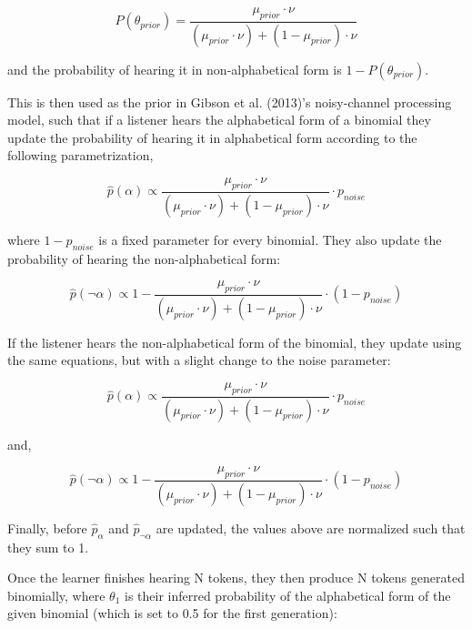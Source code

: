 \documentclass[
  jou,floatsintext]{apa6}
\begin{document}
\begin{equation}
\label{eq:thetaPrior}
P(\theta_{prior}) = \frac{\mu_{prior} \cdot \nu}{(\mu_{prior} \cdot \nu) + (1 - \mu_{prior}) \cdot \nu}
\end{equation}

and the probability of hearing it in non-alphabetical form is \(1-P(\theta_{prior})\).

This is then used as the prior in Gibson et al. (2013)'s noisy-channel processing model, such that if a listener hears the alphabetical form of a binomial they update the probability of hearing it in alphabetical form according to the following parametrization,

\begin{equation}
\label{eq:phatAlpha}
\hat{p}(\alpha) \propto \frac{\mu_{prior} \cdot \nu}{(\mu_{prior} \cdot \nu) + (1 - \mu_{prior}) \cdot \nu} \cdot p_{noise}
\end{equation}

where \(1 - p_{noise}\) is a fixed parameter for every binomial. They also update the probability of hearing the non-alphabetical form:

\begin{equation}
\label{eq:phatNonalpha}
\hat{p}(\neg\alpha) \propto 1 - \frac{\mu_{prior} \cdot \nu}{(\mu_{prior} \cdot \nu) + (1 - \mu_{prior}) \cdot \nu} \cdot (1-p_{noise})
\end{equation}

If the listener hears the non-alphabetical form of the binomial, they update using the same equations, but with a slight change to the noise parameter:

\begin{equation}
\label{eq:phatAlpha2}
\hat{p}(\alpha) \propto \frac{\mu_{prior} \cdot \nu}{(\mu_{prior} \cdot \nu) + (1 - \mu_{prior}) \cdot \nu} \cdot p_{noise} 
\end{equation}

and,

\begin{equation}
\label{eq:phatNonalpha2}
\hat{p}(\neg\alpha) \propto 1 - \frac{\mu_{prior} \cdot \nu}{(\mu_{prior} \cdot \nu) + (1 - \mu_{prior}) \cdot \nu} \cdot (1-p_{noise}) 
\end{equation}

Finally, before \(\hat{p}_\alpha\) and \(\hat{p}_{\neg\alpha}\) are updated, the values above are normalized such that they sum to 1.

Once the learner finishes hearing N tokens, they then produce N tokens generated binomially, where \(\theta_1\) is their inferred probability of the alphabetical form of the given binomial (which is set to 0.5 for the first generation):
\end{document}
